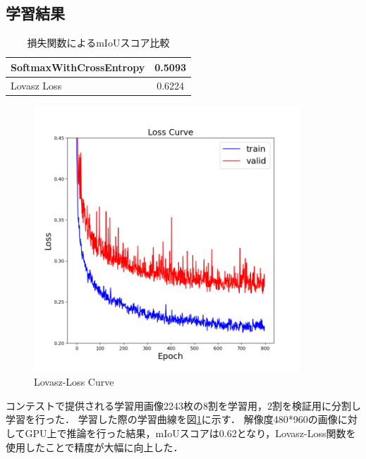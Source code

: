 \subsection{学習結果}
\begin{table}[b]
    \caption{損失関数によるmIoUスコア比較} \vspace{1mm}
    \label{compare_resolution}
    \begin{center}
        \begin{tabular}{lc}
            SoftmaxWithCrossEntropy & 0.5093                     \\ \hline
            Lovasz Loss             & 0.6224
        \end{tabular}
    \end{center}
\end{table}
\begin{figure}[t]
    \begin{center}
        \includegraphics[width=10.0cm]{figures/loss_curve.png}
        \caption{Lovasz-Loss Curve}
        \label{loss_curve}
        \end{center}
\end{figure}
コンテストで提供される学習用画像2243枚の8割を学習用，2割を検証用に分割し学習を行った．
学習した際の学習曲線を図\ref{loss_curve}に示す．
解像度480*960の画像に対してGPU上で推論を行った結果，mIoUスコアは0.62となり，Lovasz-Loss関数を使用したことで精度が大幅に向上した．